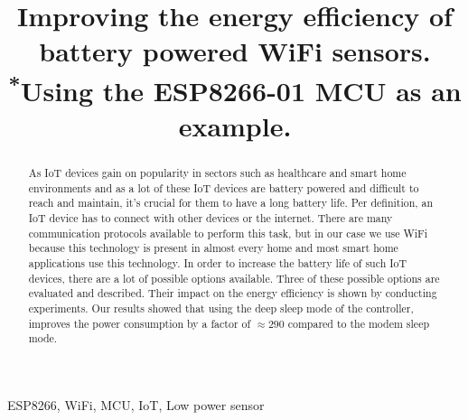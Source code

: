 \documentclass[conference]{IEEEtran}
\begin{document}
\title{Improving the energy efficiency of battery powered WiFi sensors.\\
{\footnotesize \textsuperscript{*}Using the ESP8266-01 MCU as an example.}
}

\author{
\and
{}
\and
{}
}

\maketitle

\begin{abstract}
As IoT devices gain on popularity in sectors such as healthcare and smart home environments and as a lot of these IoT devices are battery powered and difficult to reach and maintain, it's crucial for them to have a long battery life.
Per definition, an IoT device has to connect with other devices or the internet. 
There are many communication protocols available to perform this task, but in our case we use WiFi because this technology is present in almost every home and most smart home applications use this technology.
In order to increase the battery life of such IoT devices, there are a lot of possible options available.
Three of these possible options are evaluated and described. Their impact on the energy efficiency is shown by conducting experiments.
Our results showed that using the deep sleep mode of the controller, improves the power consumption by a factor of $\approx 290$ compared to the modem sleep mode.


\end{abstract}

\begin{IEEEkeywords}
ESP8266, WiFi, MCU, IoT, Low power sensor
\end{IEEEkeywords}
\end{document}
